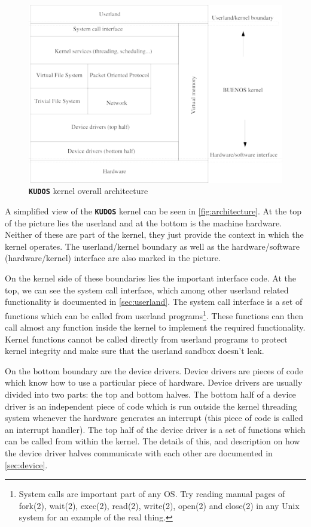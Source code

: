 \documentclass[twoside,a4paper]{report}
\newlength{\tablewidth}
\newcommand{\kudos}{\texttt{\textbf{KUDOS}}}
\begin{document}
\begin{figure}
\begin{center}
\includegraphics[width=\tablewidth,angle=0]{pics/architecture.png}
\caption{\kudos{} kernel overall architecture}
\label{fig:architecture}
\end{center}
\end{figure}

 
A simplified view of the \kudos{} kernel can be seen in
\autoref{fig:architecture}. At the top of the picture lies the
userland and at the bottom is the machine hardware. Neither of these
are part of the kernel, they just provide the context in which the
kernel operates. The userland/kernel boundary as well as the
hardware/software (hardware/kernel) interface are also marked in the
picture.

On the kernel side of these boundaries lies the important interface
code.  At the top, we can see the system call interface, which among
other userland related functionality is documented in
\autoref{sec:userland}. The system call interface is a set of
functions which can be called from userland programs\footnote{System
calls are important part of any OS. Try reading manual pages of
fork(2), wait(2), exec(2), read(2), write(2), open(2) and close(2) in
any Unix system for an example of the real thing.}. These functions
can then call almost any function inside the kernel to implement the
required functionality. Kernel functions cannot be called directly
from userland programs to protect kernel integrity and make sure that
the userland sandbox doesn't leak.

On the bottom boundary are the device drivers. Device drivers are
pieces of code which know how to use a particular piece of hardware.
Device drivers are usually divided into two parts: the top and bottom
halves. The bottom half of a device driver is an independent piece of
code which is run outside the kernel threading system whenever the
hardware generates an interrupt (this piece of code is called an
interrupt handler). The top
half of the device driver is a set of functions which can be called
from within the kernel. The details of this, and description on how
the device driver halves communicate with each other are documented in
\autoref{sec:device}.
\end{document}
